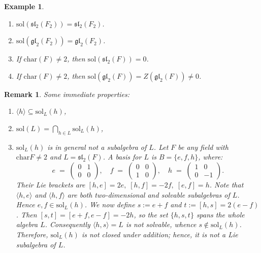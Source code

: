 \documentclass[11pt]{amsart}
\theoremstyle{plain}
\newtheorem{remark}[theorem]{Remark}
\newtheorem{example}[theorem]{Example}
\def\ch{\mathrm{char}}
\def\sol{\mathrm{sol}}
\begin{document}
\begin{example}
\begin{enumerate}
 \item $\sol(\mathfrak{sl}_2(F_2))= \mathfrak{sl}_2(F_2)$. 
 \item $\sol(\mathfrak{gl}_2(F_2))= \mathfrak{gl}_2(F_2)$. 
 \item If $\ch(F) \neq 2$, then $\sol(\mathfrak{sl}_2(F))= 0$.
 \item If $\ch(F) \neq 2$, then $\sol(\mathfrak{gl}_2(F)) = Z(\mathfrak{gl}_2(F)) \neq 0$.
\end{enumerate}
\end{example}

\begin{remark}\label{sl2(3)-basis}
Some immediate properties:
\begin{enumerate}
\item $\langle h\rangle \subseteq \sol_L(h)$,

\item $\sol(L) = \bigcap_{h\in L} \sol_L(h)$,

\item $\sol_L(h)$ is in general not a subalgebra of $L$.  Let  $F$ be any field with $\mathrm{char} F\neq 2$ and $L=\mathfrak{sl}_{2}(F)$. A basis for $L$ is $B= \{e, f, h\}$, where:
\[  e \;=\;   \begin{pmatrix} 
0 & 1 \\ 0 & 0 
\end{pmatrix},
  \quad
  f \;=\;   \begin{pmatrix} 
  0 & 0 \\ 1 & 0 
  \end{pmatrix},
  \quad
  h \;=\;   \begin{pmatrix} 
  1 & 0 \\ 0 & -1 
  \end{pmatrix}.\]
Their Lie brackets are $[h,e]=2e,\; [h,f]=-2f,\; [e,f]=h$. Note that $\langle h, e\rangle$ and $\langle h, f\rangle$ are both two-dimensional and solvable subalgebras of $L$.  Hence $e, f\in\sol_L(h)$. We now define $s:=e+f$ and $t:=[h,s]=2(e-f)$.
Then $[s,t]=[e+f,e-f]=-2h$, so the set $\{h,s,t\}$ spans the whole algebra $L$. Consequently $\langle h, s \rangle = L$ is not solvable, whence $s\notin\sol_L(h)$. Therefore, $\sol_L(h)$ is not closed under addition; hence, it is not a Lie subalgebra of $L$.
\end{enumerate}
\end{remark}
\end{document}
